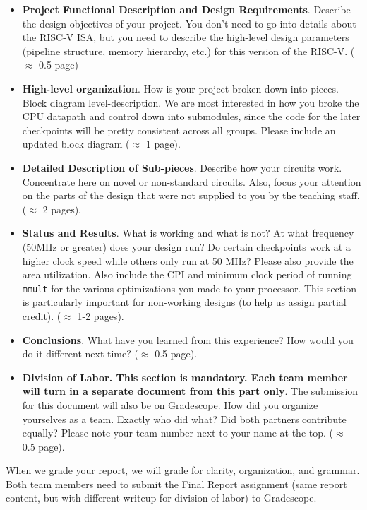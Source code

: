 \documentclass[11pt]{article}
\begin{document}
\begin{itemize}
  \item \textbf{Project Functional Description and Design Requirements}. Describe the design objectives of your project.  You don't need to go into details about the RISC-V ISA, but you need to describe the high-level design parameters (pipeline structure, memory hierarchy, etc.) for this version of the RISC-V. ($\approx$ 0.5 page)
  \item \textbf{High-level organization}. How is your project broken down into pieces. Block diagram level-description. We are most interested in how you broke the CPU datapath and control
  down into submodules, since the code for the later checkpoints will be pretty consistent across all groups. Please include an updated block diagram ($\approx$ 1 page).
  \item \textbf{Detailed Description of Sub-pieces}. Describe how your circuits work. Concentrate here on novel or non-standard circuits. Also, focus your attention on the parts of the design that were not supplied to you by the teaching staff. ($\approx$ 2 pages).
  \item \textbf{Status and Results}. What is working and what is not? At what frequency (50MHz or greater) does your design run? Do certain checkpoints work at a higher clock speed while others only run at 50 MHz? Please also provide the area utilization. Also include the CPI and minimum clock period of running \verb|mmult| for the various optimizations you made to your processor. This section is particularly important for non-working designs (to help us assign partial credit). ($\approx$ 1-2 pages).
  \item \textbf{Conclusions}. What have you learned from this experience? How would you do it different next time? ($\approx$ 0.5 page).
  \item \textbf{Division of Labor. This section is mandatory. Each team member will turn in a separate document from this part only}. The submission for this document will also be on Gradescope. How did you organize yourselves as a team. Exactly who did what? Did both partners contribute equally? Please note your team number next to your name at the top. ($\approx$ 0.5 page).
\end{itemize}

When we grade your report, we will grade for clarity, organization, and grammar.
Both team members need to submit the Final Report assignment (same report content, but with different writeup for division of labor) to Gradescope.
\end{document}
